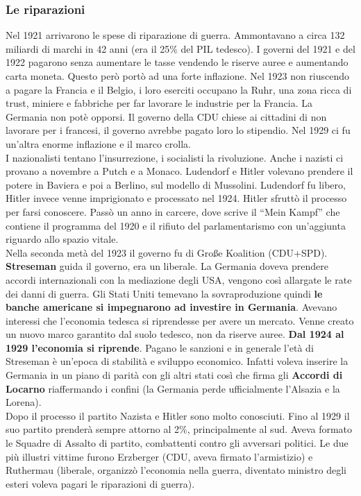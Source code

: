 \subsubsection{Le riparazioni}
Nel 1921 arrivarono le spese di riparazione di guerra. Ammontavano a circa 132 miliardi di marchi in
42 anni (era il 25\% del PIL tedesco). I governi del 1921 e del 1922 pagarono senza aumentare le 
tasse vendendo le riserve auree e aumentando carta moneta. Questo però portò ad una forte inflazione.
Nel 1923 non riuscendo a pagare la Francia e il Belgio, i loro eserciti occupano la Ruhr, una zona
ricca di trust, miniere e fabbriche per far lavorare le industrie per la Francia. La Germania non
potè opporsi. Il governo della CDU chiese ai cittadini di non lavorare per i francesi, il governo
avrebbe pagato loro lo stipendio. Nel 1929 ci fu un'altra enorme inflazione e il marco crolla.\\
I nazionalisti tentano l'insurrezione, i socialisti la rivoluzione. Anche i nazisti ci provano
a novembre a Putch e a Monaco. Ludendorf e Hitler volevano prendere il potere in Baviera e poi a 
Berlino, sul modello di Mussolini. Ludendorf fu libero, Hitler invece venne imprigionato e processato
nel 1924. Hitler sfruttò il processo per farsi conoscere. Passò un anno in carcere, dove scrive il
``Mein Kampf'' che contiene il programma del 1920 e il rifiuto del parlamentarismo con un'aggiunta 
riguardo allo spazio vitale.\\ [\baselineskip]
Nella seconda metà del 1923 il governo fu di Gro{\ss}e Koalition (CDU+SPD). \textbf{Streseman} guida
il governo, era un liberale. La Germania doveva prendere accordi internazionali con la mediazione
degli USA, vengono così allargate le rate dei danni di guerra. Gli Stati Uniti temevano la
sovraproduzione quindi \textbf{le banche americane si impegnarono ad investire in Germania}. Avevano 
interessi che l'economia tedesca si riprendesse per avere un mercato. Venne creato un nuovo marco
garantito dal suolo tedesco, non da riserve auree. \textbf{Dal 1924 al 1929 l'economia si riprende}.
Pagano le sanzioni e in generale l'età di Streseman è un'epoca di stabilità e sviluppo economico.
Infatti voleva inserire la Germania in un piano di parità con gli altri stati così che firma gli
\textbf{Accordi di Locarno} riaffermando i confini (la Germania perde ufficialmente l'Alsazia e la 
Lorena).\\ [\baselineskip]
Dopo il processo il partito Nazista e Hitler sono molto conosciuti. Fino al 1929 il suo partito
prenderà sempre attorno al 2\%, principalmente al sud. Aveva formato le Squadre di Assalto di 
partito, combattenti contro gli avversari politici. Le due più illustri vittime furono Erzberger 
(CDU, aveva firmato l'armistizio) e Ruthermau (liberale, organizzò l'economia nella guerra, diventato
ministro degli esteri voleva pagari le riparazioni di guerra).

